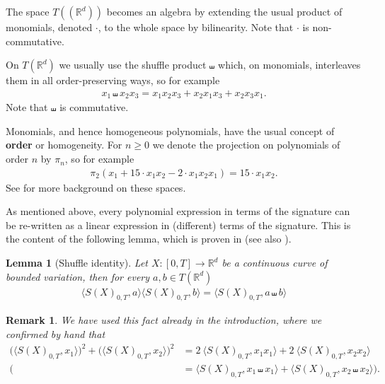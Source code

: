 \documentclass{scrartcl}
\theoremstyle{plain}
\newtheorem{lemma}[theorem]{Lemma}
\newtheorem{remark}[theorem]{Remark}
\theoremstyle{definition}
\newcommand{\R}{\mathbb{R}}
\newcommand{\1}[1]{1_{\{#1\}}}
\newcommand{\ds}{d} %
\newcommand{\TC}{T((\R^\ds))} %
\newcommand{\TS}{T(\R^\ds)} %
\begin{document}
The space $\TC$ becomes an algebra by extending the usual product of monomials, denoted $\cdot$, to the whole space by bilinearity.
Note that $\cdot$ is non-commutative.

On $\TS$ we usually use the shuffle product $\shuffle$ which, on monomials, interleaves them in all order-preserving ways,
so for example
\begin{align*}
 x_1 \shuffle x_2 x_3
 =
 x_1 x_2 x_3
 +
 x_2 x_1 x_3
 +
 x_2 x_3 x_1.
\end{align*}
Note that $\shuffle$ is commutative.

Monomials, and hence homogeneous polynomials, have the usual concept of \textbf{order} or homogeneity.
For $n \ge 0$ we denote the projection on polynomials of order $n$ by $\pi_n$, so for example
\begin{align*}
  \pi_2 
  \left( x_1  + 15\cdot x_1 x_2 - 2\cdot x_1 x_2 x_1 \right)
  =
  15\cdot x_1 x_2.
\end{align*}
%
See \cite{bib:Reu1993} for more background on these spaces.



As mentioned above, every polynomial expression in terms of the signature
can be re-written as a linear expression in (different) terms of the signature.
This is the content of the following lemma, which is proven in \cite{bib:Ree1958} (see also \cite[Corollary 3.5]{bib:Reu1993}).
\begin{lemma}[Shuffle identity]
  \label{lem:shuffleIdentity}
  Let $X: [0,T] \to \R^d$ be a continuous curve of bounded variation, then for every $a,b \in T(\R^d)$
  \begin{align*}
    \Big\langle S(X)_{0,T}, a \Big\rangle
    \Big\langle S(X)_{0,T}, b \Big\rangle
    =
    \Big\langle S(X)_{0,T}, a \shuffle b \Big\rangle
  \end{align*}
\end{lemma}

\begin{remark}
  We have used this fact already in the introduction, where we confirmed by hand that
  \begin{align*}
    \Big( \Big\langle S(X)_{0,T}, x_1 \Big\rangle \Big)^2
    +
    \Big( \Big\langle S(X)_{0,T}, x_2 \Big\rangle \Big)^2
    &=
    2\ \Big\langle S(X)_{0,T}, x_1 x_1 \Big\rangle
    +
    2\ \Big\langle S(X)_{0,T}, x_2 x_2 \Big\rangle \\
    \Big(
      &  =
    \Big\langle S(X)_{0,T}, x_1 \shuffle x_1 \Big\rangle
    +
    \Big\langle S(X)_{0,T}, x_2 \shuffle x_2 \Big\rangle
    \Big).
  \end{align*}
\end{remark}
\end{document}

